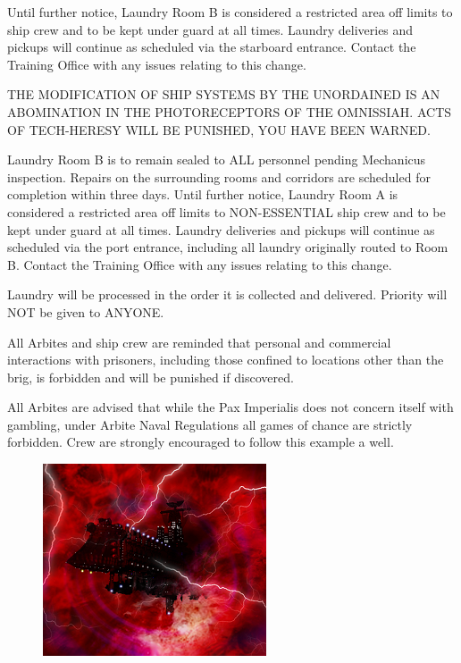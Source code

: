 

Until further notice, Laundry Room B is considered a restricted area off limits to ship crew and to be kept under guard at all times. 
Laundry deliveries and pickups will continue as scheduled via the starboard entrance. 
Contact the Training Office with any issues relating to this change.


THE MODIFICATION OF SHIP SYSTEMS BY THE UNORDAINED IS AN ABOMINATION IN THE PHOTORECEPTORS OF THE OMNISSIAH. 
ACTS OF TECH-HERESY WILL BE PUNISHED, YOU HAVE BEEN WARNED.


Laundry Room B is to remain sealed to ALL personnel pending Mechanicus inspection. 
Repairs on the surrounding rooms and corridors are scheduled for completion within three days. 
Until further notice, Laundry Room A is considered a restricted area off limits to NON-ESSENTIAL ship crew and to be kept under guard at all times. 
Laundry deliveries and pickups will continue as scheduled via the port entrance, including all laundry originally routed to Room B. 
Contact the Training Office with any issues relating to this change.


Laundry will be processed in the order it is collected and delivered. 
Priority will NOT be given to ANYONE.


All Arbites and ship crew are reminded that personal and commercial interactions with prisoners, including those confined to locations other than the brig, is forbidden and will be punished if discovered. 



All Arbites are advised that while the Pax Imperialis does not concern itself with gambling, under Arbite Naval Regulations all games of chance are strictly forbidden. 
Crew are strongly encouraged to follow this example a well.

\begin{figure}
	\begin{center}
		\includegraphics[width=\figwidth]{pics/20/7.png}
	\end{center}
\end{figure}

